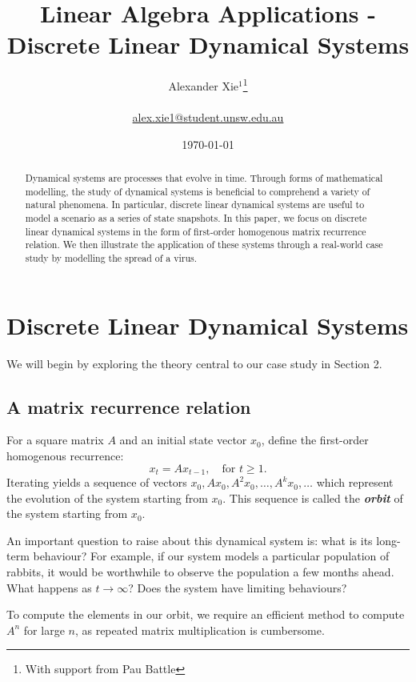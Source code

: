 \documentclass[a4paper]{article}
\title{Linear Algebra Applications - Discrete Linear Dynamical Systems}
\author{Alexander Xie$^1$\thanks{With support from Pau Battle}\\\\
	\href{mailto:alex.xie1@student.unsw.edu.au}{alex.xie1@student.unsw.edu.au}}
\date{\printdayoff\today}
\theoremstyle{plain}
\theoremstyle{definition}
\begin{document}
\maketitle

\begin{abstract}
	Dynamical systems are processes that evolve in time. Through forms of mathematical modelling, the study of dynamical
	systems is beneficial to comprehend a variety of natural phenomena. In particular, discrete linear dynamical systems
	are useful to model a scenario as a series of state snapshots.
	In this paper, we focus on discrete linear dynamical systems in the form of first-order homogenous matrix recurrence
	relation. We then illustrate the application of these systems through a real-world case study by modelling the
	spread of a virus.

\end{abstract}

\tableofcontents

\pagebreak

\section{Discrete Linear Dynamical Systems}

We will begin by exploring the theory central to our case study in Section 2.

\subsection{A matrix recurrence relation}

For a square matrix $A$ and an initial state vector $x_0$, define the first-order homogenous recurrence:
\[ x_t=Ax_{t-1},\quad \text{for } t\geq 1. \]
Iterating yields a sequence of vectors $x_0, Ax_0, A^2x_0,\ldots, A^kx_0,\ldots$ which represent the evolution of the
system starting from $x_0$. This sequence is called the \textbf{\textit{orbit}} of the
system starting from $x_0$.

An important question to raise about this dynamical system is: what is its long-term behaviour? For example, if our
system models a particular population of rabbits, it would be worthwhile to observe the population a few months ahead.
What happens as $t\to\infty$? Does the system have limiting behaviours?

To compute the elements in our orbit, we require an efficient method to compute $A^n$ for large $n$, as repeated
matrix multiplication is cumbersome.
\end{document}
